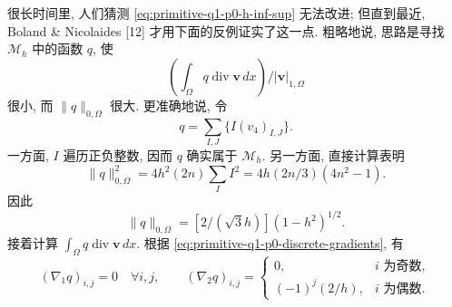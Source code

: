 很长时间里, 人们猜测 \eqref{eq:primitive-q1-p0-h-inf-sup} 无法改进;
但直到最近, Boland \& Nicolaides [12] 才用下面的反例证实了这一点.
粗略地说, 思路是寻找 $\mathcal M_h$ 中的函数 $q$, 使
\[
\left(\int_\Omega q\operatorname{div}\mathbf v\,dx\right)/|\mathbf v|_{1,\Omega}
\]
很小, 而 $\|q\|_{0,\Omega}$ 很大. 更准确地说, 令
\begin{equation}\label{eq:primitive-q1-p0-counterexample-pressure}
q=\sum_{I,J}\{I(v_4)_{I,J}\}.
\end{equation}
一方面, $I$ 遍历正负整数, 因而 $q$ 确实属于 $\mathcal M_h$.
另一方面, 直接计算表明
\[
\|q\|_{0,\Omega}^2
=4h^2(2n)\sum_I I^2
=4h(2n/3)(4n^2-1).
\]
因此
\begin{equation}\label{eq:primitive-q1-p0-counterexample-norm}
\|q\|_{0,\Omega}=[2/(\sqrt3h)](1-h^2)^{1/2}.
\end{equation}
接着计算 $\int_\Omega q\operatorname{div}\mathbf v\,dx$.
根据 \eqref{eq:primitive-q1-p0-discrete-gradients}, 有
\[
(\nabla_1q)_{i,j}=0\quad\forall i,j,
\qquad
(\nabla_2q)_{i,j}=
\begin{cases}
0,&i\text{ 为奇数},\\
(-1)^j(2/h),&i\text{ 为偶数}.
\end{cases}
\]
